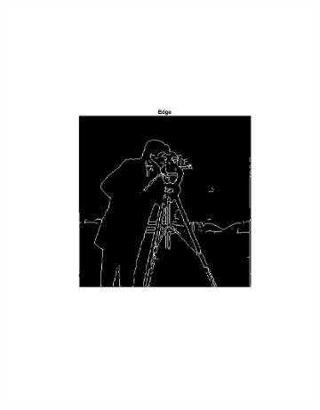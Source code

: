 \documentclass[12pt]{article}
\begin{document}
\begin{enumerate}[label=\bfseries Problem \arabic*:]
\begin{figure}[H]
\begin{subfigure}[t!]{.5\textwidth}
            \includegraphics[width=\linewidth]{MyEdgeDetector_2.pdf}
        \end{subfigure}%
    \end{figure} 
    \begin{figure}[H]
        \begin{subfigure}[t!]{.5\textwidth}

\end{subfigure}
\end{figure}
\end{enumerate}
\end{document}

